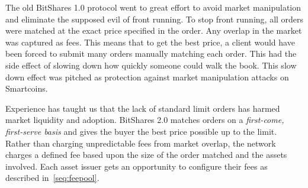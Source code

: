 The old BitShares 1.0 protocol went to great effort to avoid market
manipulation and eliminate the supposed evil of front running. To stop front
running, all orders were matched at the exact price specified in the order. Any
overlap in the market was captured as fees. This means that to get the best
price, a client would have been forced to submit many orders manually matching
each order. This had the side effect of slowing down how quickly someone could
walk the book. This slow down effect was pitched as protection against market
manipulation attacks on Smartcoins.

Experience has taught us that the lack of standard limit orders has harmed
market liquidity and adoption. BitShares 2.0 matches orders on a
\emph{first-come, first-serve basis} and gives the buyer the best price
possible up to the limit. Rather than charging unpredictable fees from market
overlap, the network charges a defined fee based upon the size of the order
matched and the assets involved. Each asset issuer gets an opportunity to
configure their fees as described in~\cref{seq:feepool}.
